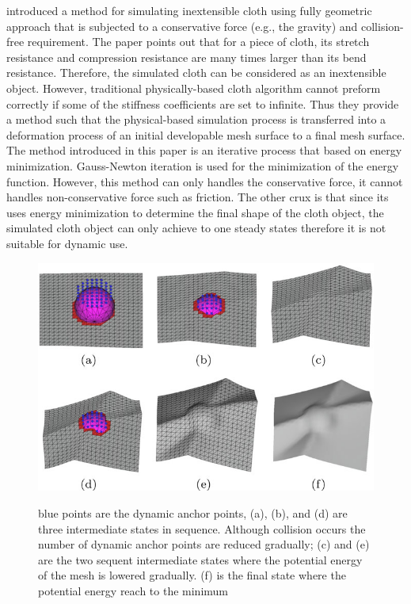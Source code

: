 \cite{Chen:2010} introduced a method for simulating inextensible cloth using fully geometric approach that is subjected to a conservative force (e.g., the gravity) and collision-free requirement. The paper points out that for a piece of cloth, its stretch  resistance and compression resistance are many times larger than its bend resistance. Therefore, the simulated cloth can be considered as an inextensible object. However, traditional physically-based cloth algorithm cannot preform correctly if some of the stiffness coefficients are set to infinite. Thus they provide a method such that the physical-based simulation process is transferred into a deformation process of an initial developable mesh surface to a final mesh surface. The method introduced in this paper is an iterative process that based on energy minimization. Gauss-Newton iteration is used for the minimization of the energy function. However, this method can only handles the conservative force, it cannot handles non-conservative force such as friction. The other crux is that since its uses energy minimization to determine the final shape of the cloth object, the simulated cloth object can only achieve to one steady states therefore it is not suitable for dynamic use. 

\begin{figure}[ht]
    \centering
	\includegraphics[width=0.7\columnwidth]{../images/chen2010}\\[1cm]
    \caption{blue points are the dynamic anchor points, (a), (b), and (d) are three intermediate states in sequence. Although collision occurs the number of dynamic anchor points are reduced gradually; (c) and (e) are the two sequent intermediate states where the potential energy of the mesh is lowered gradually. (f) is the final state where the potential energy reach to the minimum \cite{Muller:2010}}
    \label{figure:chen2010}
\end{figure}

